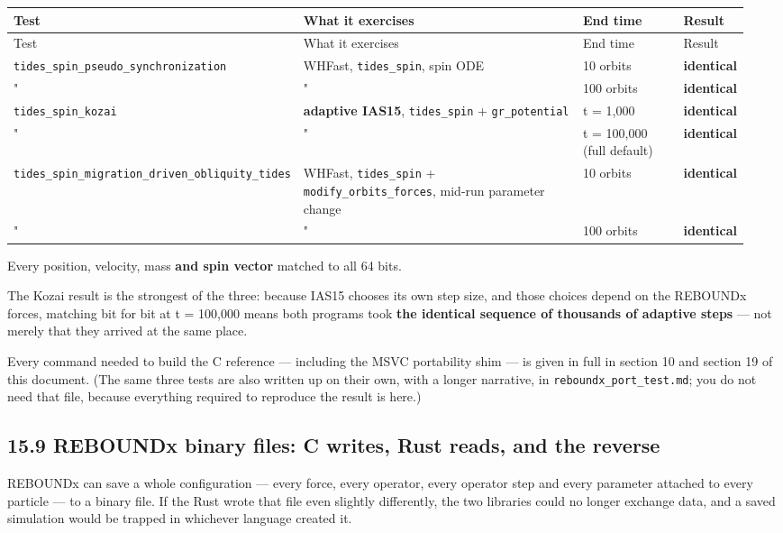 \documentclass[11pt]{article}
\begin{document}
\begin{longtable}{L{0.270\linewidth}L{0.426\linewidth}L{0.156\linewidth}L{0.098\linewidth}}
\toprule
Test & What it exercises & End time & Result \\
\midrule
\endfirsthead
\toprule
Test & What it exercises & End time & Result \\
\midrule
\endhead
\texttt{tides\_spin\_pseudo\_synchronization} & WHFast, \texttt{tides\_spin}, spin ODE & 10 orbits & \textbf{identical} \\
" & " & 100 orbits & \textbf{identical} \\
\texttt{tides\_spin\_kozai} & \textbf{adaptive IAS15}, \texttt{tides\_spin} + \texttt{gr\_potential} & t = 1,000 & \textbf{identical} \\
" & " & t = 100,000 (full default) & \textbf{identical} \\
\texttt{tides\_spin\_migration\_driven\_obliquity\_tides} & WHFast, \texttt{tides\_spin} + \texttt{modify\_orbits\_forces}, mid-run parameter change & 10 orbits & \textbf{identical} \\
" & " & 100 orbits & \textbf{identical} \\
\bottomrule
\end{longtable}

Every position, velocity, mass \textbf{and spin vector} matched to all 64 bits.

The Kozai result is the strongest of the three: because IAS15 chooses its own step size, and those choices depend on the REBOUNDx forces, matching bit for bit at t = 100,000 means both programs took \textbf{the identical sequence of thousands of adaptive steps} --- not merely that they arrived at the same place.

Every command needed to build the C reference --- including the MSVC portability shim --- is given in full in section 10 and section 19 of this document. (The same three tests are also written up on their own, with a longer narrative, in \texttt{reboundx\_port\_test.md}; you do not need that file, because everything required to reproduce the result is here.)

\subsection{15.9 REBOUNDx binary files: C writes, Rust reads, and the reverse}

REBOUNDx can save a whole configuration --- every force, every operator, every operator step and every parameter attached to every particle --- to a binary file. If the Rust wrote that file even slightly differently, the two libraries could no longer exchange data, and a saved simulation would be trapped in whichever language created it.
\end{document}
